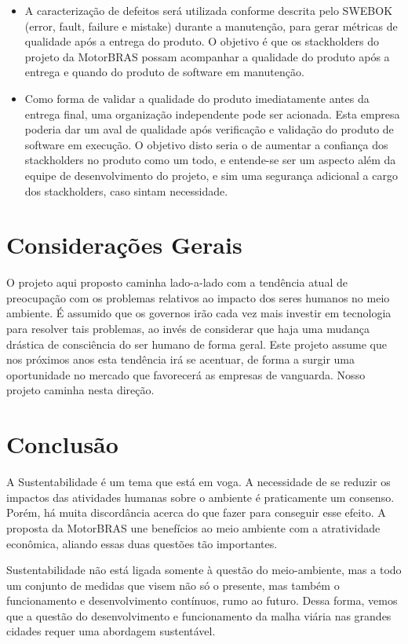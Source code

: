 \documentclass[12pt,journal,compsoc]{IEEEtran}
\begin{document}
\begin{itemize}
\item A caracterização de defeitos será utilizada conforme descrita pelo SWEBOK \cite{society_software_2004} (error, fault, failure e mistake) durante a manutenção, para gerar métricas de qualidade após a entrega do produto. O objetivo é que os stackholders do projeto da MotorBRAS possam acompanhar a qualidade do produto após a entrega e quando do produto de software em manutenção.
\item Como forma de validar a qualidade do produto imediatamente antes da entrega final, uma organização independente pode ser acionada. Esta empresa poderia dar um aval de qualidade após verificação e validação do produto de software em execução. O objetivo disto seria o de aumentar a confiança dos stackholders no produto como um todo, e entende-se ser um aspecto além da equipe de desenvolvimento do projeto, e sim uma segurança adicional a cargo dos stackholders, caso sintam necessidade. 
\end{itemize}


\section{Considerações Gerais}

O projeto aqui proposto caminha lado-a-lado com a tendência atual de preocupação com os problemas relativos ao impacto dos seres humanos no meio ambiente. É assumido que os governos irão cada vez mais investir em tecnologia para resolver tais problemas, ao invés de considerar que haja uma mudança drástica de consciência do ser humano de forma geral. Este projeto assume que nos próximos anos esta tendência irá se acentuar, de forma a surgir uma oportunidade no mercado que favorecerá as empresas de vanguarda. Nosso projeto caminha nesta direção. 


\section{Conclusão}

A Sustentabilidade é um tema que está em voga. A necessidade de se reduzir os
impactos das atividades humanas sobre o ambiente é praticamente um consenso.
Porém, há muita discordância acerca do que fazer para conseguir esse efeito. A
proposta da MotorBRAS une benefícios ao meio ambiente com a atratividade
econômica, aliando essas duas questões tão importantes.

Sustentabilidade não está ligada somente à questão do meio-ambiente, mas a todo
um conjunto de medidas que visem não só o presente, mas também o funcionamento
e desenvolvimento contínuos, rumo ao futuro. Dessa forma, vemos que a questão
do desenvolvimento e funcionamento da malha viária nas grandes cidades requer
uma abordagem sustentável.
\end{document}
